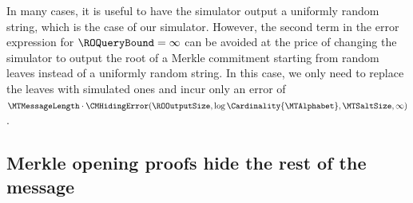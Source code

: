 






























































\begin{remark}
In many cases, it is useful to have the simulator output a uniformly random string, which is the case of our simulator. However, the second term in the error expression for $\ROQueryBound=\infty$ can be avoided at the price of changing the simulator to output the root of a Merkle commitment starting from random leaves instead of a uniformly random string. In this case, we only need to replace the leaves with simulated ones and incur only an error of $\MTMessageLength \cdot \CMHidingError(\ROOutputSize,\log\Cardinality{\MTAlphabet},\MTSaltSize,\infty)$.
\end{remark}





\subsection{Merkle opening proofs hide the rest of the message}
\label{section:merkle-commitment-hiding-2}

